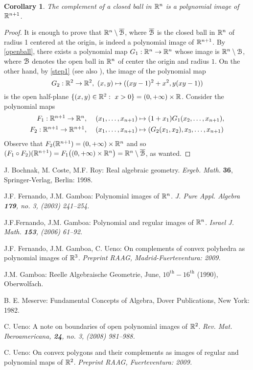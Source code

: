 \documentclass[11pt,a4paper]{amsart}
\newtheorem{cor}[theor]{Corollary}
\theoremstyle{definition}
\theoremstyle{remark}
\newcommand{\ball}{{\EuScript B}}
\newcommand{\ol}{\overline}
\begin{document}
\begin{cor}\label{closed ball}
The complement of a closed ball in ${\mathbb R}^n$ is a polynomial image of ${\mathbb R}^{n+1}$.
\end{cor}
\begin{proof}
It is enough to prove that $\R^n\setminus\ol{\ball}$, where $\ol{\ball}$ is the closed ball in ${\mathbb R}^n$ of radius 1 centered at the origin, is indeed a polynomial image of ${\mathbb R}^{n+1}$. By \ref{openball}, there exists a polynomial map $G_1:{\mathbb R}^n\to{\mathbb R}^n$ whose image is $\R^n\setminus{\ball}$, where ${\ball}$ denotes the open ball in ${\mathbb R}^n$ of center the origin and radius $1$. On the other hand, by \ref{step1} (see also \cite[1.4(iv)]{fg1}), the image of the polynomial map
$$
G_2:\R^2\to\R^2, \ (x,y)\mapsto((xy-1)^2+x^2,y(xy-1))
$$
is the open half-plane $\{(x,y)\in\R^2:\ x>0\}=(0,+\infty)\times\R$. Consider the polynomial maps
$$
\begin{array}{rl}
F_1:{\mathbb R}^{n+1}\to{\mathbb R}^n,&\ (x_1,\ldots,x_{n+1})\mapsto (1+x_1)G_1(x_2,\ldots,x_{n+1}),\\[4pt]
F_2:{\mathbb R}^{n+1}\to{\mathbb R}^{n+1},&\ (x_1,\ldots,x_{n+1})\mapsto (G_2(x_1,x_2),x_3,\ldots,x_{n+1})
\end{array}
$$
Observe that $F_2({\mathbb R}^{n+1})=(0,+\infty)\times{\mathbb R}^n$ and so $(F_1\circ F_2)(\R^{n+1})=F_1\big((0,+\infty)\times\R^n\big)=\R^n\setminus\ol{\ball}$, as wanted.
\end{proof}


\begin{thebibliography}{FGU}

 J. Bochnak, M. Coste, M.F. Roy: Real algebraic geometry. {\em Ergeb. Math.} {\bf 36}, Springer-Verlag, Berlin: 1998.

 J.F. Fernando, J.M. Gamboa: Polynomial images of ${\mathbb R}^n$. \em J. Pure Appl. Algebra \em {\bf 179}, no. 3, (2003) 241--254.

 J.F.Fernando, J.M. Gamboa: Polynomial and regular images of ${\mathbb R}^n$. \em Israel J. Math. \em {\bf 153}, (2006) 61--92.

 J.F. Fernando, J.M. Gamboa, C. Ueno: On complements of convex polyhedra as polynomial images of ${\mathbb R}^3$. \em Preprint RAAG\em, Madrid-Fuerteventura: 2009.

 J.M. Gamboa: Reelle Algebraische Geometrie, June,
$10^{\text{th}}-16^{\text{th}}$ (1990), Oberwolfach.

 B. E. Meserve: Fundamental Concepts of Algebra, Dover Publications, New York: 1982.

 C. Ueno: A note on boundaries of open polynomial images of ${\mathbb R}^2$. \em Rev. Mat. Iberoamericana\em, {\bf 24}, no. 3, (2008) 981--988.

 C. Ueno: On convex polygons and their complements as images of regular and polynomial maps of ${\mathbb R}^2$. \em Preprint \em RAAG, Fuerteventura: 2009.

\end{thebibliography}
\end{document}
